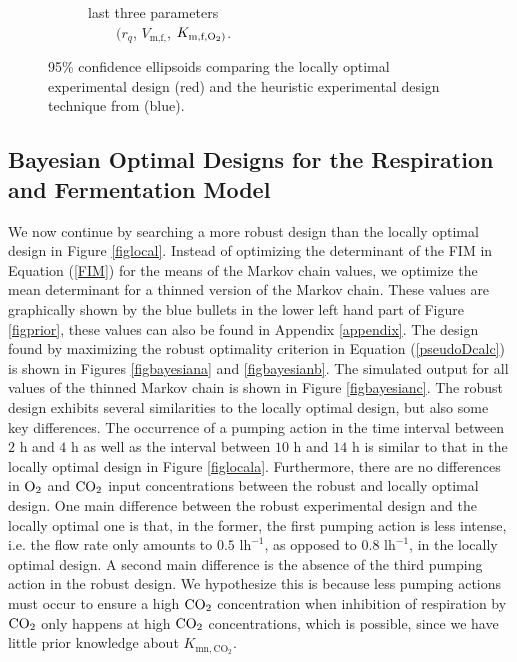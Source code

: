 \begin{figure}[H]
\begin{subfigure}[b]{0.45\textwidth}
		\caption{last three parameters \\ $\qquad (r_q$, $V_{\text{m,f,}}$, $K_{\text{m,f},\text{O}_2)}$.}
		\label{figlocalg}
	\end{subfigure}
	\caption{95\% confidence ellipsoids comparing {\color{red}the locally optimal experimental design (red) and the heuristic experimental design technique from \textcite{ho} (blue)}.} 
	\label{figellipsoid}	
\end{figure}
\subsection{Bayesian Optimal Designs for the Respiration and Fermentation Model}
We now continue by searching a more robust design than the locally optimal design in Figure \ref{figlocal}. Instead of optimizing the determinant of the FIM in Equation (\ref{FIM}) for the means of the Markov chain values, we optimize the mean determinant for a thinned version of the Markov chain. These values are graphically shown by the blue bullets in the lower left hand part of Figure \ref{figprior}, {\color{red}these values can also be found in Appendix \ref{appendix}}. The design found by maximizing the robust optimality criterion in Equation (\ref{pseudoDcalc}) is shown in Figures \ref{figbayesiana} and \ref{figbayesianb}. The simulated output for all values of the thinned Markov chain is shown in Figure \ref{figbayesianc}. The robust design exhibits several similarities to the locally optimal design, but also some key differences. The occurrence of a pumping action in the time interval between $2$ h and $4$ h as well as the interval between $10$ h and $14$ h is similar to that in the locally optimal design in Figure \ref{figlocala}. Furthermore, there are no differences in $\text{O}_2$ and $\text{CO}_2$ input concentrations between the robust and locally optimal design. One main difference between the robust experimental design and the locally optimal one is that, in the former, the first pumping action is less intense, i.e. the flow rate only amounts to $0.5$ l$\text{h}^{-1}$, as opposed to  $0.8$ l$\text{h}^{-1}$, in the locally optimal design. A second main difference is the absence of the third pumping action in the robust design. We hypothesize this is because  less pumping actions must occur to ensure a high $\text{CO}_2$ concentration when inhibition of respiration by $\text{CO}_2$ only happens at high $\text{CO}_2$ concentrations, which is possible, since we have little prior knowledge about $K_{\text{mn},\text{CO}_2}$.
